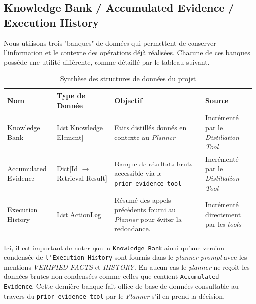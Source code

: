 \subsection{Knowledge Bank / Accumulated Evidence / Execution History}
Nous utilisons trois "banques" de données qui permettent de conserver l'information et le contexte des opérations déjà réalisées. Chacune de ces banques possède une utilité différente, comme détaillé par le tableau suivant.

\renewcommand{\arraystretch}{1.5}
\begin{table}[h]
\centering
\label{tab:data_structures}
\begin{tabular}{|m{3cm}|m{3cm}|m{4cm}|m{4cm}|}
\hline
\rowcolor{gray!30} \textbf{Nom} & \textbf{Type de Donnée} & \textbf{Objectif} & \textbf{Source} \\ \hline
Knowledge Bank & List[Knowledge Element] & Faits distillés donnés en contexte au \textit{Planner} & Incrémenté par le \textit{Distillation Tool}\\ \hline
Accumulated Evidence & Dict[Id $\rightarrow$ Retrieval Result] & Banque de résultats bruts accessible via le \texttt{prior\_evidence\_tool} & Incrémenté par le \textit{Distillation Tool} \\ \hline
Execution History & List[ActionLog] & Résumé des appels précédents fourni au \textit{Planner} pour éviter la redondance. & Incrémenté directement par les \textit{tools}  \\ \hline
\end{tabular}
\caption{Synthèse des structures de données du projet}
\end{table}

Ici, il est important de noter que la \texttt{Knowledge Bank} ainsi qu'une version condensée de \texttt{l'Execution History} sont fournis dans le \textit{planner prompt} avec les mentions \textit{VERIFIED FACTS} et \textit{HISTORY}. En aucun cas le \textit{planner} ne reçoit les données brutes non condensées comme celles que contient \texttt{Accumulated Evidence}. Cette dernière banque fait office de base de données consultable au travers du \texttt{prior\_evidence\_tool} par le \textit{Planner} s'il en prend la décision.

